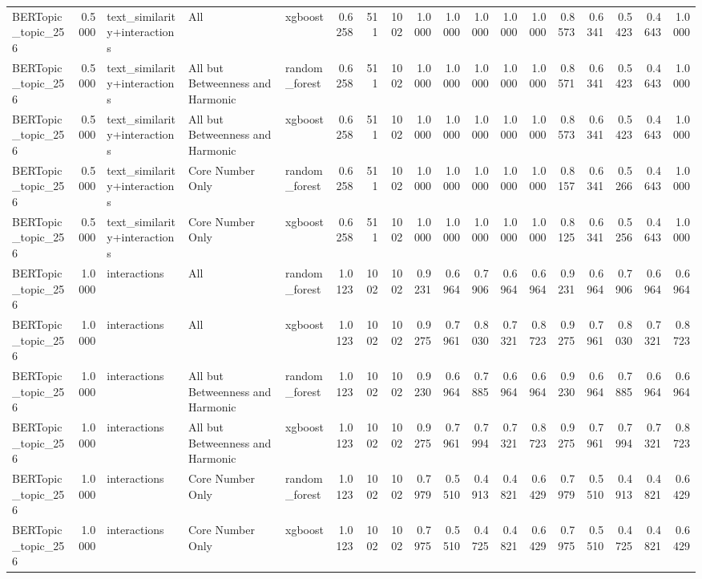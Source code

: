 \begin{tabular}{lrlllrrrrrrrrrrrrr}
BERTopic_topic_256 & 0.5000 & text_similarity+interactions & All & xgboost & 0.6258 & 511 & 1002 & 1.0000 & 1.0000 & 1.0000 & 1.0000 & 1.0000 & 0.8573 & 0.6341 & 0.5423 & 0.4643 & 1.0000 \\
BERTopic_topic_256 & 0.5000 & text_similarity+interactions & All but Betweenness and Harmonic & random_forest & 0.6258 & 511 & 1002 & 1.0000 & 1.0000 & 1.0000 & 1.0000 & 1.0000 & 0.8571 & 0.6341 & 0.5423 & 0.4643 & 1.0000 \\
BERTopic_topic_256 & 0.5000 & text_similarity+interactions & All but Betweenness and Harmonic & xgboost & 0.6258 & 511 & 1002 & 1.0000 & 1.0000 & 1.0000 & 1.0000 & 1.0000 & 0.8573 & 0.6341 & 0.5423 & 0.4643 & 1.0000 \\
BERTopic_topic_256 & 0.5000 & text_similarity+interactions & Core Number Only & random_forest & 0.6258 & 511 & 1002 & 1.0000 & 1.0000 & 1.0000 & 1.0000 & 1.0000 & 0.8157 & 0.6341 & 0.5266 & 0.4643 & 1.0000 \\
BERTopic_topic_256 & 0.5000 & text_similarity+interactions & Core Number Only & xgboost & 0.6258 & 511 & 1002 & 1.0000 & 1.0000 & 1.0000 & 1.0000 & 1.0000 & 0.8125 & 0.6341 & 0.5256 & 0.4643 & 1.0000 \\
BERTopic_topic_256 & 1.0000 & interactions & All & random_forest & 1.0123 & 1002 & 1002 & 0.9231 & 0.6964 & 0.7906 & 0.6964 & 0.6964 & 0.9231 & 0.6964 & 0.7906 & 0.6964 & 0.6964 \\
BERTopic_topic_256 & 1.0000 & interactions & All & xgboost & 1.0123 & 1002 & 1002 & 0.9275 & 0.7961 & 0.8030 & 0.7321 & 0.8723 & 0.9275 & 0.7961 & 0.8030 & 0.7321 & 0.8723 \\
BERTopic_topic_256 & 1.0000 & interactions & All but Betweenness and Harmonic & random_forest & 1.0123 & 1002 & 1002 & 0.9230 & 0.6964 & 0.7885 & 0.6964 & 0.6964 & 0.9230 & 0.6964 & 0.7885 & 0.6964 & 0.6964 \\
BERTopic_topic_256 & 1.0000 & interactions & All but Betweenness and Harmonic & xgboost & 1.0123 & 1002 & 1002 & 0.9275 & 0.7961 & 0.7994 & 0.7321 & 0.8723 & 0.9275 & 0.7961 & 0.7994 & 0.7321 & 0.8723 \\
BERTopic_topic_256 & 1.0000 & interactions & Core Number Only & random_forest & 1.0123 & 1002 & 1002 & 0.7979 & 0.5510 & 0.4913 & 0.4821 & 0.6429 & 0.7979 & 0.5510 & 0.4913 & 0.4821 & 0.6429 \\
BERTopic_topic_256 & 1.0000 & interactions & Core Number Only & xgboost & 1.0123 & 1002 & 1002 & 0.7975 & 0.5510 & 0.4725 & 0.4821 & 0.6429 & 0.7975 & 0.5510 & 0.4725 & 0.4821 & 0.6429 \\

\end{tabular}
